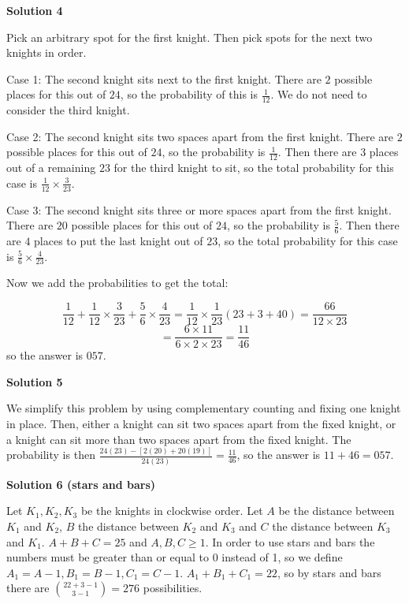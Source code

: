 \begin{enumerate}
 



\textbf{Solution 4}

Pick an arbitrary spot for the first knight. Then pick spots for the next two knights in order.

 Case 1: The second knight sits next to the first knight. There are $2$ possible places for this out of $24$, so the probability of this is $\frac{1}{12}$. We do not need to consider the third knight.

 Case 2: The second knight sits two spaces apart from the first knight. There are $2$ possible places for this out of $24$, so the probability is $\frac{1}{12}$. Then there are $3$ places out of a remaining $23$ for the third knight to sit, so the total probability for this case is $\frac{1}{12} \times \frac{3}{23}$.

 Case 3: The second knight sits three or more spaces apart from the first knight. There are $20$ possible places for this out of $24$, so the probability is $\frac{5}{6}$. Then there are $4$ places to put the last knight out of $23$, so the total probability for this case is $\frac{5}{6}\times\frac{4}{23}$.

 Now we add the probabilities to get the total: 

 
 \[\frac{1}{12}+\frac{1}{12}\times\frac{3}{23}+\frac{5}{6}\times\frac{4}{23}=\frac{1}{12}\times\frac{1}{23}\left(23+3+40\right)=\frac{66}{12\times 23}\]
 \[=\frac{6\times 11}{6\times 2 \times 23}=\frac{11}{46}\] so the answer is $\boxed{057}$.

 



\textbf{Solution 5}

We simplify this problem by using complementary counting and fixing one knight in place. Then, either a knight can sit two spaces apart from the fixed knight, or a knight can sit more than two spaces apart from the fixed knight. The probability is then $\frac{24\left(23\right)-\left[2\left(20\right)+20\left(19\right)\right]}{24\left(23\right)}=\frac{11}{46}$, so the answer is $11+46=\boxed{057}$.

 



\textbf{Solution 6 (stars and bars)}

Let $K_1, K_2, K_3$ be the knights in clockwise order. Let $A$ be the distance between $K_1$ and $K_2$, $B$ the distance between $K_2$ and $K_3$ and $C$ the distance between $K_3$ and $K_1$. $A + B + C = 25$ and $A, B, C \geq 1$. In order to use stars and bars the numbers must be greater than or equal to 0 instead of 1, so we define $A_1 = A - 1, B_1 = B - 1, C_1 = C - 1$. $A_1 + B_1 + C_1 = 22$, so by stars and bars there are $\binom{22 + 3 - 1}{3 - 1} = 276$ possibilities.


\end{enumerate}
